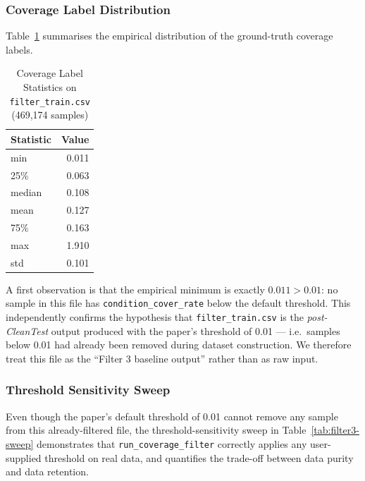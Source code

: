 \documentclass[acmlarge,nonacm,screen]{acmart}
\begin{document}
\subsubsection{Coverage Label Distribution}

Table~\ref{tab:coverage-stats} summarises the empirical distribution of the
ground-truth coverage labels.

\begin{table}[htbp]
\caption{Coverage Label Statistics on \texttt{filter\_train.csv} (469,174 samples)}
\label{tab:coverage-stats}
\begin{tabular}{@{}lr@{}}
\toprule
\textbf{Statistic} & \textbf{Value} \\
\midrule
min & 0.011 \\
25\% & 0.063 \\
median & 0.108 \\
mean & 0.127 \\
75\% & 0.163 \\
max & 1.910 \\
std & 0.101 \\
\bottomrule
\end{tabular}
\end{table}

A first observation is that the empirical minimum is exactly $0.011 > 0.01$:
no sample in this file has \texttt{condition\_cover\_rate} below the
default threshold. This independently confirms the hypothesis that
\texttt{filter\_train.csv} is the \textit{post-CleanTest} output produced
with the paper's threshold of 0.01 --- i.e.\ samples below 0.01 had
already been removed during dataset construction. We therefore treat this
file as the ``Filter 3 baseline output'' rather than as raw input.

\subsubsection{Threshold Sensitivity Sweep}

Even though the paper's default threshold of 0.01 cannot remove any
sample from this already-filtered file, the threshold-sensitivity sweep
in Table~\ref{tab:filter3-sweep} demonstrates that
\texttt{run\_coverage\_filter} correctly applies any user-supplied
threshold on real data, and quantifies the trade-off between data
purity and data retention.
\end{document}
